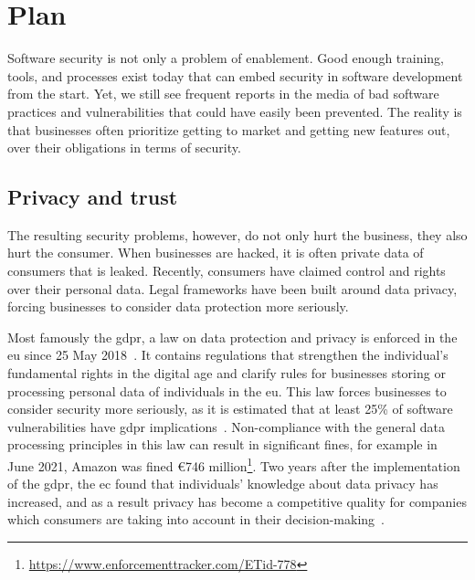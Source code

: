 \section{Plan}
\label{sec:related-plan}

Software security is not only a problem of enablement.
Good enough training, tools, and processes exist today that can embed security in software development from the start.
Yet, we still see frequent reports in the media of bad software practices and vulnerabilities that could have easily been prevented.
The reality is that businesses often prioritize getting to market and getting new features out, over their obligations in terms of security.

\subsection{Privacy and trust}
The resulting security problems, however, do not only hurt the business, they also hurt the consumer.
When businesses are hacked, it is often private data of consumers that is leaked.
Recently, consumers have claimed control and rights over their personal data.
Legal frameworks have been built around data privacy, forcing businesses to consider data protection more seriously.

Most famously the \gls{gdpr}, a law on data protection and privacy is enforced in the \gls{eu} since 25 May 2018~\cite{gdpr}.
It contains regulations that strengthen the individual's fundamental rights in the digital age and clarify rules for businesses storing or processing personal data of individuals in the \gls{eu}.
This law forces businesses to consider security more seriously, as it is estimated that at least 25\% of software vulnerabilities have \gls{gdpr} implications~\cite{gdprhackerone}.
Non-compliance with the general data processing principles in this law can result in significant fines, for example in June 2021, Amazon was fined €746 million\footnote{\url{https://www.enforcementtracker.com/ETid-778}}.
Two years after the implementation of the \gls{gdpr}, the \gls{ec} found that individuals' knowledge about data privacy has increased, and as a result privacy has become a competitive quality for companies which consumers are taking into account in their decision-making~\cite{gdprfra}.

